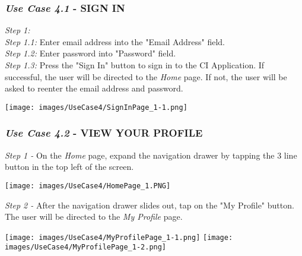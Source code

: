 \documentclass[11pt]{article}
\begin{document}
        \subsubsection{\textit{Use Case 4.1} - \uppercase{Sign In}}
            \textit{Step 1:}\\[0.5cm]
            \textit{Step 1.1:} Enter email address into the "Email Address" field.\\[0.5cm]
            \textit{Step 1.2:} Enter password into "Password" field.\\[0.5cm]
            \textit{Step 1.3:} Press the "Sign In" button to sign in to the CI Application. If successful, the user will be directed to the \textit{Home} page. If not, the user will be asked to reenter the email address and password.\\[0.5cm]
            \begin{center}
                \texttt{[image: images/UseCase4/SignInPage\_1-1.png]}
            \end{center}
        \subsubsection{\textit{Use Case 4.2} - \uppercase{View Your Profile}}
            \textit{Step 1 -} On the \textit{Home} page, expand the navigation drawer by tapping the 3 line button in the top left of the screen.\\[0.5cm]
            \begin{center}
                \texttt{[image: images/UseCase4/HomePage\_1.PNG]}
            \end{center}
            \textit{Step 2 -} After the navigation drawer slides out, tap on the "My Profile" button. The user will be directed to the \textit{My Profile} page.\\[0.5cm]
            \begin{center}
                \texttt{[image: images/UseCase4/MyProfilePage\_1-1.png]}
                \newline
                \newline
                \texttt{[image: images/UseCase4/MyProfilePage\_1-2.png]}
            \end{center}
\end{document}
